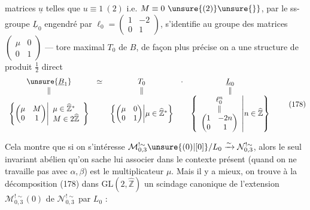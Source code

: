 matrices \unsure{$\{$} $\underline u$  telles que $u\equiv1\ (2)$ i.e. $M\equiv0\ \unsure{(2)}\unsure{\}}$, par le ss-groupe  $\underline L_0$ engendré par $\ell_0=\begin{pmatrix}1&-2\\0&1\end{pmatrix}$, s'identifie au groupe des matrices $\begin{pmatrix}\mu&0\\0&1\end{pmatrix}$ ---  tore maximal $T_0$ de $B$, de façon plus précise on a une structure de produit $\frac12$ direct
\[
\begin{array}{ccccc}
\unsure{\underline B_1}&\simeq&T_0&\cdot&\underline L_0\\
\Vert&&\Vert&&\Vert\\
\left\{\begin{pmatrix}\mu&M\\0&1\end{pmatrix}\middle|\begin{array}{l}\mu\in\widehat{\mathbb Z}^{*}\\M\in2\widehat{\mathbb Z}\end{array}\right\}&&
\left\{\begin{pmatrix}\mu&0\\0&1\end{pmatrix}\middle|\mu\in\widehat{\mathbb Z}^{*}\right\}&&
\left\{\begin{array}{c}\ell_0^n\\\Vert\\\begin{pmatrix}1&-2n\\0&1\end{pmatrix}\end{array}\middle|n\in\widehat{\mathbb Z}\right\}
\end{array}
\tag{178}
\]

Cela montre que si on s'intéresse  $\mathcal M_{0,3}^{!\sim}\unsure{(0)|[0]}/L_0\xrightarrow{\sim}\mathcal N_{0,3}^{!\sim}$, alors le seul invariant abélien qu'on sache lui associer dans le contexte présent (quand on ne travaille pas avec $\alpha,\beta$) est le multiplicateur $\mu$. Mais il y a mieux\unsure{${}^{\times}$}, on trouve  à la décomposition (178) dans $\mathrm{GL}(2,\widehat{\mathbb Z})$ un scindage canonique de l'extension $\mathcal M_{0,3}^{!\sim}(0)$ de $\mathcal N_{0,3}^{!\sim}$ par $L_0$ :

